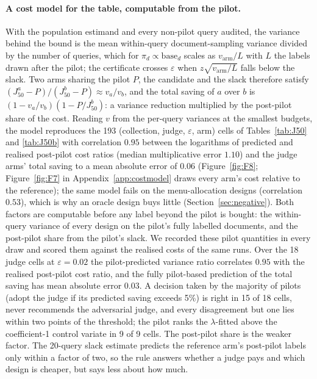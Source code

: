 \documentclass{article}
\newcommand{\eps}{\varepsilon}
\newcommand{\Jfifty}{J_{50}}
\begin{document}
\paragraph{A cost model for the table, computable from the pilot.} With the population estimand and every non-pilot query audited, the variance behind the bound is the mean within-query document-sampling variance divided by the number of queries, which for $\pi_d\propto\mathrm{base}_d$ scales as $v_{\text{arm}}/L$ with $L$ the labels drawn after the pilot; the certificate crosses $\eps$ when $z\sqrt{v_{\text{arm}}/L}$ falls below the slack. Two arms sharing the pilot $P$, the candidate and the slack therefore satisfy $(\Jfifty^{a}-P)/(\Jfifty^{b}-P)\approx v_a/v_b$, and the total saving of $a$ over $b$ is $(1-v_a/v_b)(1-P/\Jfifty^{b})$: a variance reduction multiplied by the post-pilot share of the cost. Reading $v$ from the per-query variances at the smallest budgets, the model reproduces the 193 (collection, judge, $\eps$, arm) cells of Tables~\ref{tab:J50} and \ref{tab:J50b} with correlation $0.95$ between the logarithms of predicted and realised post-pilot cost ratios (median multiplicative error $1.10$) and the judge arms' total saving to a mean absolute error of $0.06$ (Figure~\ref{fig:F8}; Figure~\ref{fig:F7} in Appendix~\ref{app:costmodel} draws every arm's cost relative to the reference); the same model fails on the menu-allocation designs (correlation $0.53$), which is why an oracle design buys little (Section~\ref{sec:negative}). Both factors are computable before any label beyond the pilot is bought: the within-query variance of every design on the pilot's fully labelled documents, and the post-pilot share from the pilot's slack. We recorded these pilot quantities in every draw and scored them against the realised costs of the same runs. Over the 18 judge cells at $\eps=0.02$ the pilot-predicted variance ratio correlates $0.95$ with the realised post-pilot cost ratio, and the fully pilot-based prediction of the total saving has mean absolute error $0.03$. A decision taken by the majority of pilots (adopt the judge if its predicted saving exceeds 5\%) is right in 15 of 18 cells, never recommends the adversarial judge, and every disagreement but one lies within two points of the threshold; the pilot ranks the $\lambda$-fitted above the coefficient-1 control variate in 9 of 9 cells. The post-pilot share is the weaker factor. The 20-query slack estimate predicts the reference arm's post-pilot labels only within a factor of two, so the rule answers whether a judge pays and which design is cheaper, but says less about how much.
\end{document}
